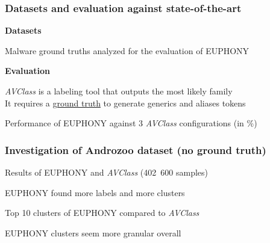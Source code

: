 \begin{frame}
    \frametitle{Datasets and evaluation against state-of-the-art}
    \centering

    \begin{block}{}
        \centering
        \textbf{Datasets}
    \end{block}
    \smallskip{}
    \begin{table}[!ht]
        \resizebox{0.8\textwidth}{!}{
            
        }
        \caption{\footnotesize{Malware ground truths analyzed for the evaluation of EUPHONY}}
    \end{table}

    \vspace{-15pt}

    \begin{block}{}
        \centering
        \textbf{Evaluation}
    \end{block}
    \smallskip{}
    {\em AVClass} is a labeling tool that outputs the most likely family \\
    \smallskip{}
    It requires a \underline{ground truth} to generate generics and aliases tokens

    \vspace{-10pt}

    \begin{table}
        \resizebox{\textwidth}{!}{
            
        }
        \caption{\footnotesize{{Performance of EUPHONY against 3 {\em AVClass} configurations (in \%)}}}
    \end{table}

\end{frame}

\begin{frame}
    \frametitle{Investigation of Androzoo dataset (no ground truth)}
    \centering

    \begin{table}[!ht]
        \resizebox{0.6\textwidth}{!}{
            
        }
        \caption{\footnotesize{Results of EUPHONY and {\em AVClass} (402~600 samples)}}
    \end{table}

    \vspace{-10pt}

    EUPHONY found more labels and more clusters

    \medskip{}

    \begin{table}[!ht]
        \resizebox{0.65\textwidth}{!}{
            
        }
        \caption{\footnotesize{Top 10 clusters of EUPHONY compared to {\em AVClass}}}
    \end{table}

    \vspace{-11pt}

    EUPHONY clusters seem more granular overall

\end{frame}

